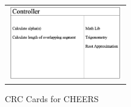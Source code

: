 \begin{figure}[h!]
        \begin{tabular}{@{}c@{}}
          \includegraphics[width=.4\linewidth,height=90pt]{resources/Controller.png}
        \end{tabular}

        \vspace{\floatsep}
      \caption{CRC Cards for CHEERS}\label{fig:myfig}
  \end{figure}
